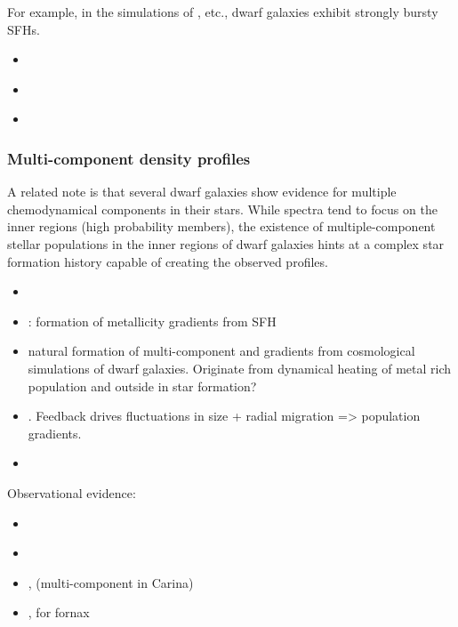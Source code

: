 For example, in the simulations of \citet{wheeler+2019}, etc., dwarf
galaxies exhibit strongly bursty SFHs.

\begin{itemize}
\tightlist
\item
  \citet{maxwell+2012}
\item
  \citet{wright+2019}
\item
  \citet{azartash-namin+2024}
\end{itemize}

\subsubsection{Multi-component density
profiles}\label{multi-component-density-profiles}

A related note is that several dwarf galaxies show evidence for multiple
chemodynamical components in their stars. While spectra tend to focus on
the inner regions (high probability members), the existence of
multiple-component stellar populations in the inner regions of dwarf
galaxies hints at a complex star formation history capable of creating
the observed profiles.

\begin{itemize}
\tightlist
\item
  \citet{benitez-llambay+2016}
\item
  \citet{mercado+2021}: formation of metallicity gradients from SFH
\item
  \citet{revaz+jablonka2018} natural formation of multi-component and
  gradients from cosmological simulations of dwarf galaxies. Originate
  from dynamical heating of metal rich population and outside in star
  formation?
\item
  \citet{el-badry+2016}. Feedback drives fluctuations in size + radial
  migration =\textgreater{} population gradients.
\item
\end{itemize}

Observational evidence:

\begin{itemize}
\tightlist
\item
  \citet{arronyo-polonio+2024}
\item
  \citet{pace+2020}
\item
  \citet{fabrizio+2016}, \citet{kordopatis+2016} (multi-component in
  Carina)
\item
  \citet{battaglia+2006}, \citet{amorisco+evans2012} for fornax
\end{itemize}

